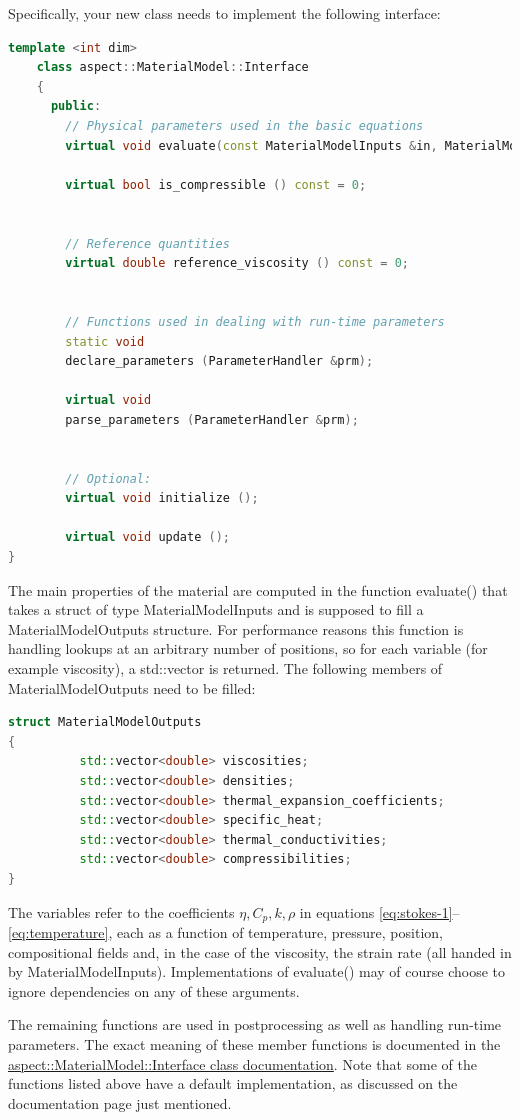 \documentclass{article}
\begin{document}
Specifically, your new class needs to implement the following interface:
\begin{lstlisting}[frame=single,language=C++]
    template <int dim>
    class aspect::MaterialModel::Interface
    {
      public:
        // Physical parameters used in the basic equations
        virtual void evaluate(const MaterialModelInputs &in, MaterialModelOutputs &out) const=0;

        virtual bool is_compressible () const = 0;


        // Reference quantities
        virtual double reference_viscosity () const = 0;


        // Functions used in dealing with run-time parameters
        static void
        declare_parameters (ParameterHandler &prm);

        virtual void
        parse_parameters (ParameterHandler &prm);


        // Optional:
        virtual void initialize ();

        virtual void update ();
}
\end{lstlisting}
The main properties of the material are computed in the function
evaluate() that takes a struct of type MaterialModelInputs and is
supposed to fill a MaterialModelOutputs structure. For performance
reasons this function is handling lookups at an arbitrary number
of positions, so for each variable (for example viscosity), a
std::vector is returned. The following members of MaterialModelOutputs
need to be filled:
\begin{lstlisting}[frame=single,language=C++]
struct MaterialModelOutputs
{
          std::vector<double> viscosities;
          std::vector<double> densities;
          std::vector<double> thermal_expansion_coefficients;
          std::vector<double> specific_heat;
          std::vector<double> thermal_conductivities;
          std::vector<double> compressibilities;
}
\end{lstlisting}
The variables refer to the coefficients $\eta,C_p,k,\rho$ in
equations \eqref{eq:stokes-1}--\eqref{eq:temperature}, each as a function of
temperature, pressure, position, compositional fields and, in the case of the viscosity, the strain
rate (all handed in by MaterialModelInputs). Implementations of evaluate() may of course choose to ignore
dependencies on any of these arguments.

The remaining functions are used in postprocessing as well as
handling run-time parameters. The exact meaning of these member functions is
documented in the
\href{doc/doxygen/classaspect_1_1MaterialModel_1_1Interface.html}{aspect::MaterialModel::Interface
class documentation}. Note that some of the functions listed above have a
default implementation, as discussed on the documentation page just
mentioned.
\end{document}
